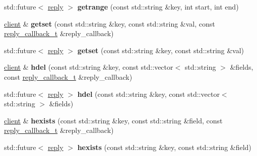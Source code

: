 \begin{DoxyCompactItemize}
\item 
\mbox{\label{classcpp__redis_1_1client_a3a0ed59f7fc32ba22c1a9be3c02e5468}} 
std\+::future$<$ \hyperlink{classcpp__redis_1_1reply}{reply} $>$ {\bfseries getrange} (const std\+::string \&key, int start, int end)
\item 
\mbox{\label{classcpp__redis_1_1client_a124dca021c3aedd3f8cbb52263e7fec8}} 
\hyperlink{classcpp__redis_1_1client}{client} \& {\bfseries getset} (const std\+::string \&key, const std\+::string \&val, const \hyperlink{classcpp__redis_1_1client_a061a1140d36d2eaeda82b09a0bb3f9f2}{reply\+\_\+callback\+\_\+t} \&reply\+\_\+callback)
\item 
\mbox{\label{classcpp__redis_1_1client_abcbf060105acb8b1d7b14a5102be19a0}} 
std\+::future$<$ \hyperlink{classcpp__redis_1_1reply}{reply} $>$ {\bfseries getset} (const std\+::string \&key, const std\+::string \&val)
\item 
\mbox{\label{classcpp__redis_1_1client_adc62af1a2d07d04fbf274f98f374ab47}} 
\hyperlink{classcpp__redis_1_1client}{client} \& {\bfseries hdel} (const std\+::string \&key, const std\+::vector$<$ std\+::string $>$ \&fields, const \hyperlink{classcpp__redis_1_1client_a061a1140d36d2eaeda82b09a0bb3f9f2}{reply\+\_\+callback\+\_\+t} \&reply\+\_\+callback)
\item 
\mbox{\label{classcpp__redis_1_1client_a56d4df4d31ffc56e097a8a78cb85d861}} 
std\+::future$<$ \hyperlink{classcpp__redis_1_1reply}{reply} $>$ {\bfseries hdel} (const std\+::string \&key, const std\+::vector$<$ std\+::string $>$ \&fields)
\item 
\mbox{\label{classcpp__redis_1_1client_a36aa37c50e8b5e44e17c4f1f0d2c656e}} 
\hyperlink{classcpp__redis_1_1client}{client} \& {\bfseries hexists} (const std\+::string \&key, const std\+::string \&field, const \hyperlink{classcpp__redis_1_1client_a061a1140d36d2eaeda82b09a0bb3f9f2}{reply\+\_\+callback\+\_\+t} \&reply\+\_\+callback)
\item 
\mbox{\label{classcpp__redis_1_1client_a1fede52ba18414d75f37e776cc62b7f8}} 
std\+::future$<$ \hyperlink{classcpp__redis_1_1reply}{reply} $>$ {\bfseries hexists} (const std\+::string \&key, const std\+::string \&field)

\end{DoxyCompactItemize}
